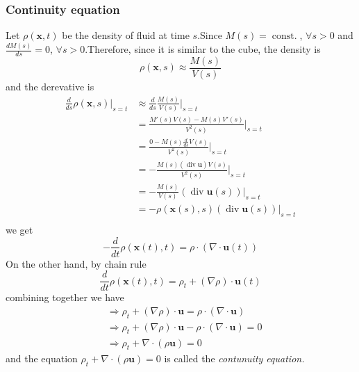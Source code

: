 \subsubsection{Continuity equation} %

Let $\rho(\textbf{x},t)$ be the density of fluid at time $s$.Since $M(s)=\operatorname{const.}$, $\forall s>0$ and $\displaystyle \frac{dM(s)}{ds} = 0$, $\forall s>0$.Therefore, since it is similar to the cube, the density is
\begin{equation}
\rho(\textbf{x},s) \approx \frac{M(s)}{V(s)}
\end{equation}
and the derevative is 
\begin{equation}
\begin{aligned}
\frac{d}{ds}\rho(\textbf{x},s) \Bigg|_{s=t}
&\approx \frac{d}{ds}\frac{M(s)}{V(s)} \Bigg|_{s=t}\\
&= \frac{M'(s)V(s) - M(s)V'(s)}{V^2(s)} \Bigg|_{s=t}\\
&= \frac{0 - M(s)\frac{d}{ds}V(s)}{V^2(s)} \Bigg|_{s=t}\\
&=  -\frac{M(s)(\operatorname{div}\textbf{u})V(s)}{V^2(s)} \Bigg|_{s=t}\\
&=  -\frac{M(s)}{V(s)}(\operatorname{div}\textbf{u}(s)) \Bigg|_{s=t}\\
&=  -\rho(\textbf{x}(s),s)(\operatorname{div}\textbf{u}(s)) \Bigg|_{s=t}\\
\end{aligned}
\end{equation}
we get 
\begin{equation}
- \frac{d}{dt}\rho(\textbf{x}(t),t) = \rho \cdot (\nabla\cdot \textbf{u}(t))
\end{equation}
On the other hand, by chain rule
\begin{equation}
\frac{d}{dt}\rho(\textbf{x}(t),t) = \rho_t + (\nabla\rho)\cdot \textbf{u}(t)
\end{equation}
combining together we have
\begin{equation}
\begin{aligned}
&\Rightarrow \rho_t + (\nabla\rho)\cdot \textbf{u} = \rho \cdot (\nabla\cdot \textbf{u})\\
&\Rightarrow \rho_t + (\nabla\rho)\cdot \textbf{u} - \rho \cdot (\nabla\cdot \textbf{u}) = 0\\
&\Rightarrow \rho_t + \nabla\cdot (\rho\textbf{u} ) = 0
\end{aligned}
\end{equation}
and the equation $\rho_t + \nabla\cdot (\rho\textbf{u} ) = 0$ is called the \textit{contunuity equation.}

